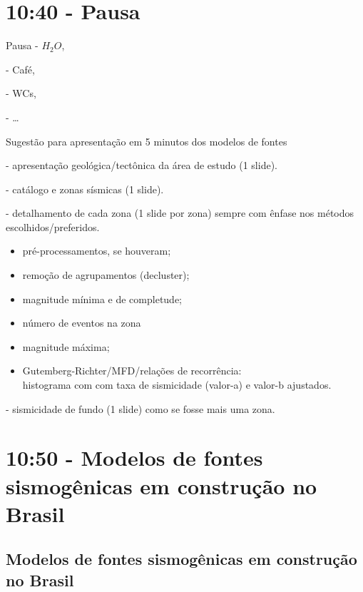 \documentclass[ucs,8pt]{beamer}
\begin{document}
\section{10:40 - Pausa}
	\begin{frame}{Pausa}
		- $H_2O$, 
		
		- Café, 
		
		- WCs,
		
		- \ldots
	\end{frame}

	\begin{frame}{Sugestão para apresentação em 5 minutos dos modelos de fontes}
		
		- apresentação geológica/tectônica da área de estudo (1 slide).
	
		- catálogo e zonas sísmicas (1 slide).
	
		- detalhamento de cada zona (1 slide por zona) sempre com ênfase nos métodos
		escolhidos/preferidos.
		
			\begin{itemize}
			  	\item pré-processamentos, se houveram;
				\item remoção de agrupamentos (decluster);
				\item magnitude mínima e de completude;
				\item número de eventos na zona
				\item magnitude máxima;
				\item Gutemberg-Richter/MFD/relações de recorrência:\\
				histograma com com taxa de sismicidade (valor-a) e valor-b ajustados.
			\end{itemize}
	
		- sismicidade de fundo (1 slide) como se fosse mais uma zona. 
	
	\end{frame}


\section{10:50 - Modelos de fontes sismogênicas em construção no Brasil}
	\subsection{Modelos de fontes sismogênicas em construção no Brasil}
	
\end{document}
